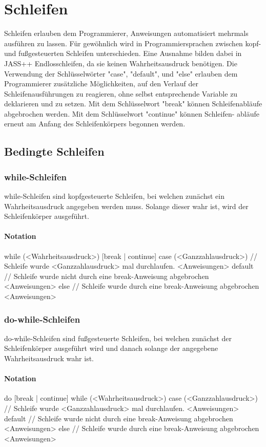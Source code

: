 \chapter{Schleifen}
Schleifen erlauben dem Programmierer, Anweisungen automatisiert mehrmals ausführen zu lassen.
Für gewöhnlich wird in Programmiersprachen zwischen kopf- und fußgesteuerten Schleifen unterschieden.
Eine Ausnahme bilden dabei in JASS++ Endlosschleifen, da sie keinen Wahrheitsausdruck benötigen.
Die Verwendung der Schlüsselwörter "case", "default", und "else" erlauben dem Programmierer zusätzliche Möglichkeiten,
auf den Verlauf der Schleifenausführungen zu reagieren, ohne selbst entsprechende Variable zu deklarieren und zu setzen.
Mit dem Schlüsselwort "break" können Schleifenabläufe abgebrochen werden. Mit dem Schlüsselwort "continue" können Schleifen-
abläufe erneut am Anfang des Schleifenkörpers begonnen werden.

\section{Bedingte Schleifen}

\subsection{while-Schleifen}
while-Schleifen sind kopfgesteuerte Schleifen, bei welchen zunächst ein Wahrheitsausdruck angegeben werden muss.
Solange dieser wahr ist, wird der Schleifenkörper ausgeführt.

\subsubsection{Notation}
while (<Wahrheitsausdruck>)
	[break | continue]
case (<Ganzzahlausdruck>) // Schleife wurde <Ganzzahlausdruck> mal durchlaufen.
	<Anweisungen>
default // Schleife wurde nicht durch eine break-Anweisung abgebrochen
	<Anweisungen>
else // Schleife wurde durch eine break-Anweisung abgebrochen
	<Anweisungen>

\subsection{do-while-Schleifen}
do-while-Schleifen sind fußgesteuerte Schleifen, bei welchen zunächst der Schleifenkörper ausgeführt wird und danach
solange der angegebene Wahrheitsausdruck wahr ist.

\subsubsection{Notation}
do
	[break | continue]
while (<Wahrheitsausdruck>)
case (<Ganzzahlausdruck>) // Schleife wurde <Ganzzahlausdruck> mal durchlaufen.
	<Anweisungen>
default // Schleife wurde nicht durch eine break-Anweisung abgebrochen
	<Anweisungen>
else // Schleife wurde durch eine break-Anweisung abgebrochen
	<Anweisungen>

